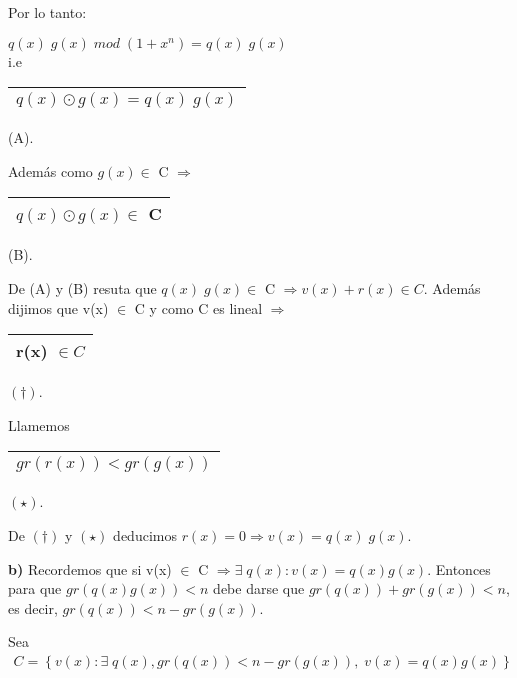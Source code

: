 \documentclass[12pt,a4paper]{report}
\begin{document}
			\vspace{3mm}
			\par Por lo tanto:
			\begin{center}
				$ q(x) \; g(x) \; mod \; (1 + x^{n}) = q(x) \; g(x) $ \\
				\vspace{3mm}
				i.e \begin{tabular}{|c|} \hline $ q(x) \odot g(x) = q(x) \; g(x) $ \\\hline \end{tabular} (A).
			\end{center}
			\par Además como $g(x) \in$ C $\Rightarrow$ \begin{tabular}{|c|} \hline $q(x) \odot g(x) \in$ C \\ \hline \end{tabular} (B).

			\vspace{3mm}
			\par De (A) y (B) resuta que $q(x) \; g(x) \in$ C $\Rightarrow v(x) + r(x) \in C$. Además dijimos que v(x) $\in$ C y como C es lineal $\Rightarrow$ \begin{tabular}{|c|} \hline r(x) $\in C$ \\\hline \end{tabular} $(\dag)$.
			\vspace{3mm}
			\par Llamemos \begin{tabular}{|c|} \hline $gr(r(x)) < gr(g(x))$ \\ \hline \end{tabular} $(\star)$.

			\vspace{5mm}
			\par De $(\dag)$ y $(\star)$ deducimos $r(x) = 0 \Rightarrow v(x) = q(x) \; g(x)$.

			\vspace{5mm}
			\textbf{b)} Recordemos que si v(x) $\in$ C $\Rightarrow \exists \; q(x) : v(x) = q(x) g(x)$. Entonces para que $gr(q(x) g(x)) < n$ debe darse que $gr(q(x)) + gr(g(x)) < n$, es decir, $gr(q(x)) < n - gr(g(x))$.

			\vspace{3mm}
			\par Sea
			\begin{eqnarray}
				\nonumber C = \left\lbrace v(x) : \exists \; q(x), gr(q(x)) < n - gr(g(x)), \; v(x) = q(x) g(x) \right\rbrace
			\end{eqnarray}
\end{document}

